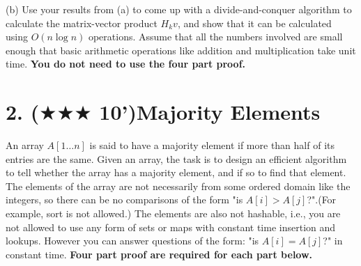 \documentclass{article}
\begin{document}
(b) Use your results from (a) to come up with a divide-and-conquer algorithm to calculate
the matrix-vector product $H_kv$, and show that it can be calculated using $O(n \log n)$
operations. Assume that all the numbers involved are small enough that basic arithmetic
operations like addition and multiplication take unit time. \textbf{You do not need to use the four part proof.}
{}

\pagebreak
\section*{2. ($\bigstar\bigstar\bigstar$ 10')Majority Elements}

An array $A[1\dots n]$ is said to have a majority element if more than half of its entries are the
same. Given an array, the task is to design an efficient algorithm to tell whether the array
has a majority element, and if so to find that element. The elements of the array are not
necessarily from some ordered domain like the integers, so there can be no comparisons of
the form "is $A[i] > A[j]$?".(For example, sort is not allowed.) The elements are
also not hashable, i.e., you are not allowed to use any form of sets or maps with constant
time insertion and lookups. However you can answer questions of the form: "is $A[i] = A[j]$?"
in constant time. {\textbf{Four part proof are required for each part below.}}\\
\end{document}
